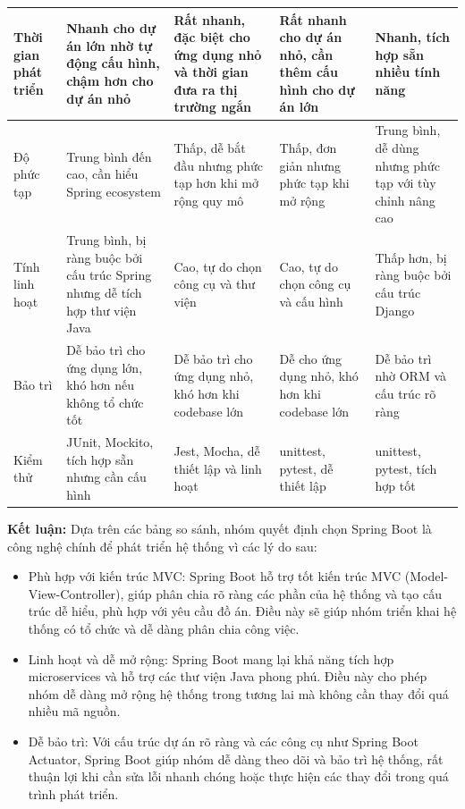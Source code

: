 \begin{enumerate}[(a)]
\begin{landscape}
\begin{longtable}{|p{3.5cm}|p{5cm}|p{5cm}|p{5cm}|p{5cm}|}
			      \hline
			      Thời gian phát triển & Nhanh cho dự án lớn nhờ tự động cấu hình, chậm hơn cho dự án nhỏ             & Rất nhanh, đặc biệt cho ứng dụng nhỏ và thời gian đưa ra thị trường ngắn & Rất nhanh cho dự án nhỏ, cần thêm cấu hình cho dự án lớn & Nhanh, tích hợp sẵn nhiều tính năng                       \\
			      \hline
			      Độ phức tạp          & Trung bình đến cao, cần hiểu Spring ecosystem                                & Thấp, dễ bắt đầu nhưng phức tạp hơn khi mở rộng quy mô                   & Thấp, đơn giản nhưng phức tạp khi mở rộng                & Trung bình, dễ dùng nhưng phức tạp với tùy chỉnh nâng cao \\
			      \hline
			      Tính linh hoạt       & Trung bình, bị ràng buộc bởi cấu trúc Spring nhưng dễ tích hợp thư viện Java & Cao, tự do chọn công cụ và thư viện                                      & Cao, tự do chọn công cụ và cấu hình                      & Thấp hơn, bị ràng buộc bởi cấu trúc Django                \\
			      \hline
			      Bảo trì              & Dễ bảo trì cho ứng dụng lớn, khó hơn nếu không tổ chức tốt                   & Dễ bảo trì cho ứng dụng nhỏ, khó hơn khi codebase lớn                    & Dễ cho ứng dụng nhỏ, khó hơn khi codebase lớn            & Dễ bảo trì nhờ ORM và cấu trúc rõ ràng                    \\
			      \hline
			      Kiểm thử             & JUnit, Mockito, tích hợp sẵn nhưng cần cấu hình                              & Jest, Mocha, dễ thiết lập và linh hoạt                                   & unittest, pytest, dễ thiết lập                           & unittest, pytest, tích hợp tốt                            \\
			      \hline
		      \end{longtable}
	      \end{landscape}

	      \textbf{Kết luận: } Dựa trên các bảng so sánh, nhóm quyết định chọn Spring Boot là công nghệ chính để phát triển hệ thống vì các lý do sau:

	      \begin{itemize}
		      \item Phù hợp với kiến trúc MVC: Spring Boot hỗ trợ tốt kiến trúc MVC (Model-View-Controller), giúp phân chia rõ ràng các phần của hệ thống và tạo cấu trúc dễ hiểu, phù hợp với yêu cầu đồ án. Điều này sẽ giúp nhóm triển khai hệ thống có tổ chức và dễ dàng phân chia công việc.
		      \item Linh hoạt và dễ mở rộng: Spring Boot mang lại khả năng tích hợp microservices và hỗ trợ các thư viện Java phong phú. Điều này cho phép nhóm dễ dàng mở rộng hệ thống trong tương lai mà không cần thay đổi quá nhiều mã nguồn.
		      \item Dễ bảo trì: Với cấu trúc dự án rõ ràng và các công cụ như Spring Boot Actuator, Spring Boot giúp nhóm dễ dàng theo dõi và bảo trì hệ thống, rất thuận lợi khi cần sửa lỗi nhanh chóng hoặc thực hiện các thay đổi trong quá trình phát triển.
	      \end{itemize}


\end{enumerate}
